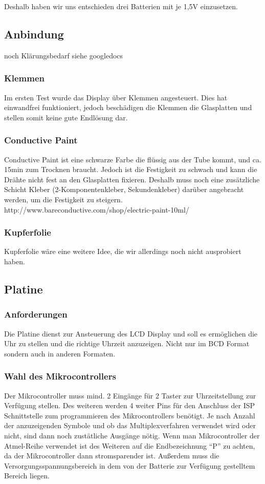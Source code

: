 Deshalb haben wir uns entschieden drei Batterien mit je 1,5V einzusetzen.

\subsection{Anbindung}
noch Klärungsbedarf siehe googledocs

\subsubsection{Klemmen}
Im ersten Test wurde das Display über Klemmen angesteuert. Dies hat einwandfrei funktioniert, jedoch beschädigen die Klemmen die Glasplatten und stellen somit keine gute Endlösung dar.

\subsubsection{Conductive Paint}
Conductive Paint ist eine schwarze Farbe die flüssig aus der Tube kommt, und ca. 15min zum Trocknen braucht. Jedoch ist die Festigkeit zu schwach und kann die Drähte nicht fest an den Glasplatten fixieren. Deshalb muss noch eine zusätzliche Schicht Kleber (2-Komponentenkleber, Sekundenkleber) darüber angebracht werden, um die Festigkeit zu steigern.
http://www.bareconductive.com/shop/electric-paint-10ml/

\subsubsection{Kupferfolie}
Kupferfolie wäre eine weitere Idee, die wir allerdings noch nicht ausprobiert haben.


\subsection{Platine}

\subsubsection{Anforderungen}
Die Platine dienst zur Ansteuerung des LCD Display und soll es ermöglichen die Uhr zu stellen und die richtige Uhrzeit anzuzeigen. Nicht nur im BCD Format sondern auch in anderen Formaten.

\subsubsection{Wahl des Mikrocontrollers}
Der Mikrocontroller muss mind. 2 Eingänge für 2 Taster zur Uhrzeitstellung zur Verfügung stellen. Des weiteren werden 4 weiter Pins für den Anschluss der ISP Schnittstelle zum programmieren des Mikrocontrollers benötigt. Je nach Anzahl der anzuzeigenden Symbole und ob das Multiplexverfahren verwendet wird oder nicht,  sind dann noch zustätliche Ausgänge nötig. Wenn man Mikrocontroller der Atmel-Reihe verwendet ist des Weiteren auf die Endbezeichnung “P” zu achten, da der Mikrocontroller dann stromsparender ist. Außerdem muss die Versorgungsspannungsbereich in dem von der Batterie zur Verfügung gestelltem Bereich liegen.

